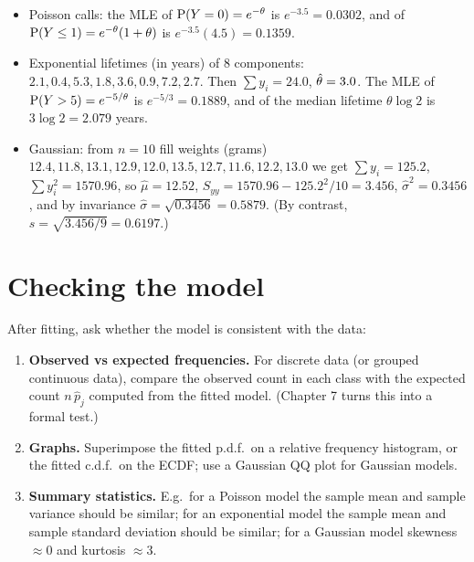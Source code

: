 \begin{example}
\begin{itemize}
  \item Poisson calls: the MLE of $\operatorname{P}(Y=0) = e^{-\theta}$ is $e^{-3.5} = 0.0302$, and
        of $\operatorname{P}(Y\le 1) = e^{-\theta}(1+\theta)$ is $e^{-3.5}(4.5) = 0.1359$.
  \item Exponential lifetimes (in years) of $8$ components:
        $2.1,0.4,5.3,1.8,3.6,0.9,7.2,2.7$. Then $\sum y_i = 24.0$, $\hat{\theta} = 3.0$. The
        MLE of $\operatorname{P}(Y>5) = e^{-5/\theta}$ is $e^{-5/3} = 0.1889$, and of the median
        lifetime $\theta\log 2$ is $3\log 2 = 2.079$ years.
  \item Gaussian: from $n=10$ fill weights (grams)
        $12.4,11.8,13.1,12.9,12.0,13.5,12.7,11.6,12.2,13.0$ we get $\sum y_i = 125.2$,
        $\sum y_i^2 = 1570.96$, so $\hat\mu = 12.52$,
        $S_{yy} = 1570.96 - 125.2^2/10 = 3.456$, $\hat\sigma^2 = 0.3456$, and by invariance
        $\hat\sigma = \sqrt{0.3456} = 0.5879$. (By contrast, $s = \sqrt{3.456/9} = 0.6197$.)
\end{itemize}
\end{example}

\section{Checking the model}

After fitting, ask whether the model is consistent with the data:
\begin{enumerate}
  \item \textbf{Observed vs expected frequencies.} For discrete data (or grouped
        continuous data), compare the observed count in each class with the expected count
        $n\,\hat p_j$ computed from the fitted model. (Chapter 7 turns this into a formal
        test.)
  \item \textbf{Graphs.} Superimpose the fitted p.d.f.\ on a relative frequency histogram,
        or the fitted c.d.f.\ on the ECDF; use a Gaussian QQ plot for Gaussian models.
  \item \textbf{Summary statistics.} E.g.\ for a Poisson model the sample mean and sample
        variance should be similar; for an exponential model the sample mean and sample
        standard deviation should be similar; for a Gaussian model skewness $\approx 0$
        and kurtosis $\approx 3$.
\end{enumerate}

